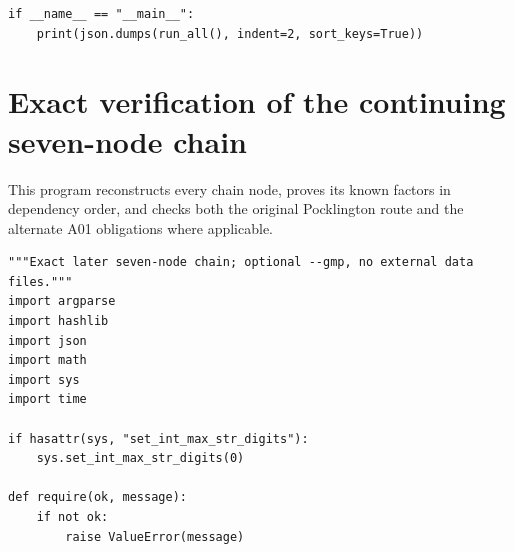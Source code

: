 \documentclass[11pt,a4paper]{article}
\theoremstyle{definition}\newtheorem{definition}[theorem]{Definition}
\theoremstyle{remark}\newtheorem{remark}[theorem]{Remark}
\begin{document}
\begin{lstlisting}[label=lst:certificates]
if __name__ == "__main__":
    print(json.dumps(run_all(), indent=2, sort_keys=True))
\end{lstlisting}

\clearpage
\section{Exact verification of the continuing seven-node chain}
\label{app:later-chain}

This program reconstructs every chain node, proves its known factors in dependency order, and checks both the original Pocklington route and the alternate A01 obligations where applicable.

\begin{lstlisting}[label=lst:later-chain]
"""Exact later seven-node chain; optional --gmp, no external data files."""
import argparse
import hashlib
import json
import math
import sys
import time

if hasattr(sys, "set_int_max_str_digits"):
    sys.set_int_max_str_digits(0)

def require(ok, message):
    if not ok:
        raise ValueError(message)


\end{lstlisting}
\end{document}
